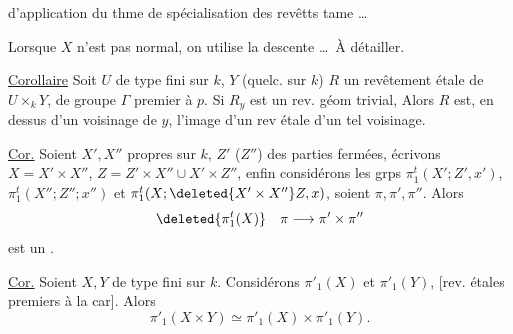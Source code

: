 d'application du thme de spécialisation 
des revêtts tame \ldots

Lorsque $X$ n'est pas normal, on utilise la descente \ldots\ À détailler.

\uline{Corollaire} 
Soit $U$ de type fini sur $k$, $Y$
(quelc. sur $k$) 
$R$ un revêtement étale  de $U\times_k Y$,
de groupe $\Gamma$ premier à $p$.
Si $R_y$ est un rev. géom trivial,
Alors $R$ est, en dessus d'un voisinage de
$y$, l'image  d'un rev étale d'un tel voisinage.

\uline{Cor.} Soient $X',X''$ propres sur $k$,
$Z'$ ($Z''$) des parties fermées,  écrivons
$X=X'\times X''$, $Z=Z'\times X''\cup X'\times Z''$,
enfin considérons les grps
$\pi_1^t(X';Z',x')$, $\pi_1^t(X'';Z'';x'')$ et
$\pi_1^t(X;\deleted{X'\times X''}Z,x)$,
 soient $\pi,\pi',\pi''$.
Alors
\[
\deleted{\pi_1^t(X)}\quad \pi\longrightarrow\pi'\times\pi''
\]
est un \uline{}.

\uline{Cor.} Soient $X,Y$ de type fini sur $k$.
Considérons $\pi'_1(X)$ et $\pi'_1(Y)$,
[rev. étales premiers à la car].
Alors
\[
\pi'_1(X\times Y)\simeq\pi'_1(X)\times\pi'_1(Y).
\]
